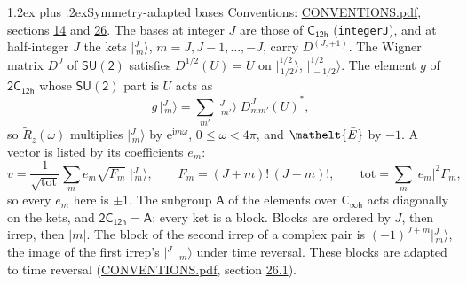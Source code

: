 \documentclass[10pt,a4paper]{article}
\makeatletter
\renewcommand\section{\@startsection{section}{1}{\z@}{-3ex plus -1ex minus -.2ex}%
  {1.2ex plus .2ex}{\normalfont\large\sffamily\bfseries\color{parttitle}}}
\numberwithin{equation}{section}
\newcommand{\eltfont}[1]{{\let\sigma\eltsigma\mathelt{#1}}}
\newcommand{\grp}[1]{\mathsf{#1}}
\newcommand{\elt}[1]{\eltfont{#1}}
\newcommand{\iunit}{\mathrm{i}}
\newcommand{\expe}{\mathrm{e}}
\newcommand{\irrJp}[2]{D^{(#1,#2)}}
\newcommand{\wignerD}[1]{D^{#1}}
\newcommand{\conj}[1]{{#1}^{*}}
\newcommand{\jm}[2]{\bigl\lvert{}^{#1}_{\,#2}\bigr\rangle}
\newcommand{\barred}[1]{\bar{#1}}
\newcommand{\lift}[1]{\tilde{#1}}
\makeatother
\begin{document}
\section{Symmetry-adapted bases}\label{s:bases}
Conventions: \href{../../CONVENTIONS.pdf}{CONVENTIONS.pdf}, sections \href{../../../rotation/CONVENTIONS.pdf\#conv.14}{14} and \href{../../CONVENTIONS.pdf\#conv.26}{26}.
\leavevmode\label{n:index.m}\label{n:vector.ket}The bases at integer $J$ are those of \href{../../../rotation/data/pdf/C12h.pdf}{$\grp{C_{12h}}$} (\texttt{integerJ}), and at half-integer $J$ the kets $\jm{J}{m}$, $m = J, J-1, \dots, -J$, carry $\irrJp{J}{+1}$. \label{n:matrix.wigner}The Wigner matrix $\wignerD{J}$ of $\grp{SU(2)}$ satisfies $\wignerD{1/2}(U) = U$ on $\jm{1/2}{1/2}$, $\jm{1/2}{-1/2}$. The element $g$ of $\grp{2C_{12h}}$ whose $\grp{SU(2)}$ part is $U$ acts as
\begin{equation}\label{e:action}g\,\jm{J}{m} = \sum_{m'} \jm{J}{m'}\; \conj{\wignerD{J}_{m m'}(U)},\end{equation}
so $\lift{R}_{z}(\omega)$ multiplies $\jm{J}{m}$ by $\expe^{\iunit m\omega}$, $0 \le \omega < 4\pi$, and $\elt{\barred{E}}$ by $-1$. \label{n:index.ketcoefficient}\label{n:vector.basis.symmetry}\label{n:index.ketweight}\label{n:index.total}A vector is listed by its coefficients $e_m$:
\begin{equation}\label{e:ket}v = \frac{1}{\sqrt{\mathrm{tot}}}\sum_m e_m\sqrt{F_m}\;\jm{J}{m},\qquad F_m = (J+m)!\,(J-m)!,\qquad \mathrm{tot} = \sum_m |e_m|^2F_m,\end{equation}
so every $e_m$ here is $\pm 1$.
\leavevmode\label{n:group.A}The subgroup $\grp{A}$ of the elements over $\grp{C_{\infty h}}$ acts diagonally on the kets, and $\grp{2C_{12h}} = \grp{A}$: every ket is a block. Blocks are ordered by $J$, then irrep, then $|m|$. The block of the second irrep of a complex pair is $(-1)^{J+m}\jm{J}{m}$, the image of the first irrep's $\jm{J}{-m}$ under time reversal. These blocks are adapted to time reversal (\href{../../CONVENTIONS.pdf}{CONVENTIONS.pdf}, section \href{../../CONVENTIONS.pdf\#conv.26.1}{26.1}).
\end{document}
